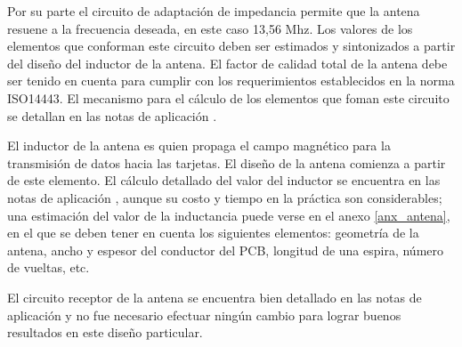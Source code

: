 \bigskip
{}

Por su parte el circuito de adaptación de impedancia permite que la antena resuene a la frecuencia deseada, en este caso 13,56 Mhz. Los valores de los elementos que conforman este circuito deben ser estimados y sintonizados a partir del diseño del inductor de la antena.
El factor de calidad total de la antena debe ser tenido en cuenta para cumplir con los requerimientos establecidos en la norma ISO14443. 
El mecanismo para el cálculo de los elementos que foman este circuito se detallan en las notas de aplicación \cite{MRICF}.

\bigskip
{}

El inductor de la antena es quien propaga el campo magnético para la transmisión de datos hacia las tarjetas. El diseño de la antena comienza a partir de este elemento.
El cálculo detallado del valor del inductor se encuentra en las notas de aplicación \cite{ACD}, aunque su costo y tiempo en la práctica son considerables; una estimación del valor de la inductancia puede verse en el anexo \ref{anx_antena}, en el que se deben tener en cuenta los siguientes elementos: geometría de la antena, ancho y espesor del conductor del PCB, longitud de una espira, número de vueltas, etc.

\bigskip
{} 

El circuito receptor de la antena se encuentra bien detallado en las notas de aplicación \cite{MRICF} y no fue necesario efectuar ningún cambio para lograr buenos resultados en este diseño particular. 
